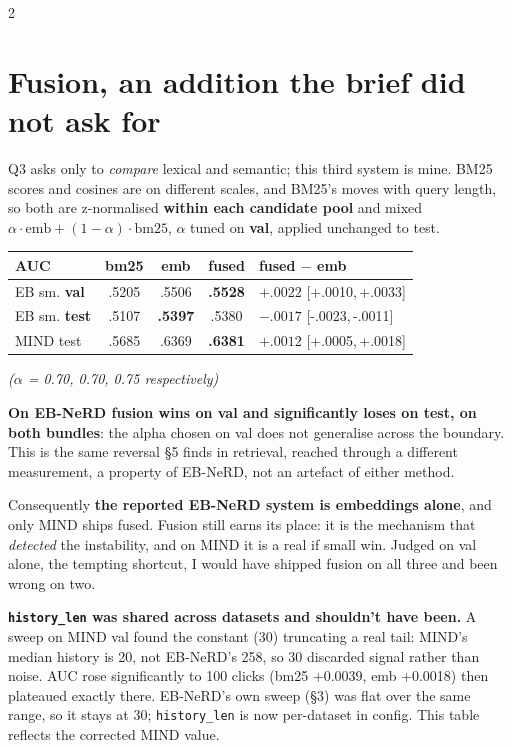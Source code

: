 \documentclass[10pt,a4paper]{article}
\newcommand{\tabsize}{\footnotesize}
\newcommand{\ci}[2]{{\scriptsize[#1,\,#2]}}
\begin{document}
\begin{multicols}{2}
\section{Fusion, an addition the brief did not ask for}

Q3 asks only to \emph{compare} lexical and semantic; this third system is mine. BM25 scores and cosines
are on different scales, and BM25's moves with query length, so both are z-normalised \textbf{within
each candidate pool} and mixed $\alpha\cdot\text{emb} + (1-\alpha)\cdot\text{bm25}$, $\alpha$ tuned on
\textbf{val}, applied unchanged to test.

\begin{center}\tabsize
\begin{tabular}{@{}lcccl@{}}
\toprule
AUC & bm25 & emb & fused & fused $-$ emb \\
\midrule
EB sm. \textbf{val} & .5205 & .5506 & \textbf{.5528} & $\mathbf{+.0022}$ \ci{+.0010}{+.0033} \\
EB sm. \textbf{test} & .5107 & \textbf{.5397} & .5380 & $\mathbf{-.0017}$ \ci{-.0023}{-.0011} \\
MIND test & .5685 & .6369 & \textbf{.6381} & $\mathbf{+.0012}$ \ci{+.0005}{+.0018} \\
\bottomrule
\end{tabular}
\end{center}

\emph{($\alpha$ = 0.70, 0.70, 0.75 respectively)}

\textbf{On EB-NeRD fusion wins on val and significantly loses on test, on both bundles}: the alpha
chosen on val does not generalise across the boundary. This is the same reversal \S5 finds in
retrieval, reached through a different measurement, a property of EB-NeRD, not an artefact of either
method.

Consequently \textbf{the reported EB-NeRD system is embeddings alone}, and only MIND ships fused.
Fusion still earns its place: it is the mechanism that \emph{detected} the instability, and on MIND it
is a real if small win. Judged on val alone, the tempting shortcut, I would have shipped fusion on all
three and been wrong on two.

\textbf{\texttt{history\_len} was shared across datasets and shouldn't have been.} A sweep on MIND val
found the constant (30) truncating a real tail: MIND's median history is 20, not EB-NeRD's 258, so 30
discarded signal rather than noise. AUC rose significantly to 100 clicks (bm25 +0.0039, emb +0.0018)
then plateaued exactly there. EB-NeRD's own sweep (\S3) was flat over the same range, so it stays at
30; \texttt{history\_len} is now per-dataset in config. This table reflects the corrected MIND value.


\end{multicols}
\end{document}
